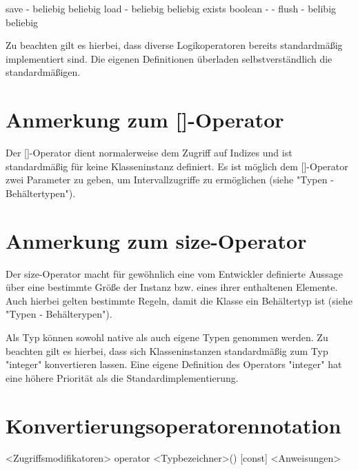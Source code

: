 save				-				beliebig		beliebig
load				-				beliebig		beliebig
exists				boolean				-			-
flush				-				belibig			beliebig

Zu beachten gilt es hierbei, dass diverse Logikoperatoren bereits standardmäßig implementiert sind.
Die eigenen Definitionen überladen selbstverständlich die standardmäßigen.

\section{Anmerkung zum []-Operator}
Der []-Operator dient normalerweise dem Zugriff auf Indizes und ist standardmäßig für keine Klasseninstanz definiert.
Es ist möglich dem []-Operator zwei Parameter zu geben, um Intervallzugriffe zu ermöglichen (siehe "Typen - Behältertypen").

\section{Anmerkung zum size-Operator}
Der size-Operator macht für gewöhnlich eine vom Entwickler definierte Aussage über eine bestimmte Größe der Instanz bzw. eines ihrer enthaltenen
Elemente.
Auch hierbei gelten bestimmte Regeln, damit die Klasse ein Behältertyp ist (siehe "Typen - Behälterypen").

Als Typ können sowohl native als auch eigene Typen genommen werden. Zu beachten gilt es hierbei, dass sich Klasseninstanzen standardmäßig
zum Typ "integer" konvertieren lassen.
Eine eigene Definition des Operators "integer" hat eine höhere Priorität als die Standardimplementierung.

\section{Konvertierungsoperatorennotation}
<Zugriffsmodifikatoren> operator <Typbezeichner>() [const]
	<Anweisungen>